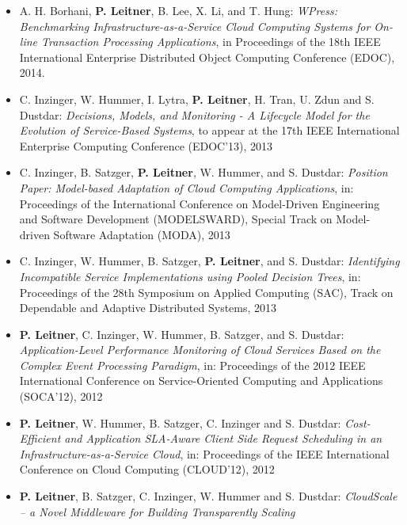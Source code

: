 \documentclass[paper=letter,fontsize=11pt]{scrartcl} %
\begin{document}
\begin{itemize}
 \item A. H. Borhani, \textbf{P. Leitner}, B. Lee, X. Li, and T. Hung: \emph{WPress: Benchmarking Infrastructure-as-a-Service Cloud Computing Systems for On-line Transaction Processing Applications}, in Proceedings of the 18th IEEE International Enterprise Distributed Object Computing Conference (EDOC), 2014.
\item C. Inzinger, W. Hummer, I. Lytra, \textbf{P. Leitner}, H. Tran, U. Zdun and S. Dustdar: \emph{Decisions, Models, and Monitoring - A Lifecycle Model for the Evolution of Service-Based Systems}, to appear at the 17th IEEE International Enterprise Computing Conference (EDOC'13), 2013
\item C. Inzinger, B. Satzger, \textbf{P. Leitner}, W. Hummer, and S. Dustdar:
\emph{Position Paper: Model-based Adaptation of Cloud Computing Applications},  in: Proceedings of the International Conference on Model-Driven Engineering and Software Development (MODELSWARD), Special Track on Model-driven Software Adaptation (MODA), 2013
\item C. Inzinger, W. Hummer, B. Satzger, \textbf{P. Leitner}, and S. Dustdar:
\emph{Identifying Incompatible Service Implementations using Pooled Decision Trees},  in: Proceedings of the 28th Symposium on Applied Computing (SAC), Track on Dependable and Adaptive Distributed Systems, 2013
\item \textbf{P. Leitner}, C. Inzinger, W. Hummer, B. Satzger, and S. Dustdar:
\emph{Application-Level Performance Monitoring of Cloud Services Based on the Complex Event Processing Paradigm}, in: Proceedings of the 2012 IEEE International Conference on Service-Oriented Computing and Applications (SOCA'12), 2012
\item \textbf{P. Leitner}, W. Hummer, B. Satzger, C. Inzinger and S. Dustdar:
\emph{Cost-Efficient and Application SLA-Aware Client Side Request Scheduling in an Infrastructure-as-a-Service Cloud}, in: Proceedings of the IEEE International Conference on Cloud Computing (CLOUD'12), 2012
\item \textbf{P. Leitner}, B. Satzger, C. Inzinger, W. Hummer and S. Dustdar:
\emph{CloudScale -- a Novel Middleware for Building Transparently Scaling
}
\end{itemize}
\end{document}
